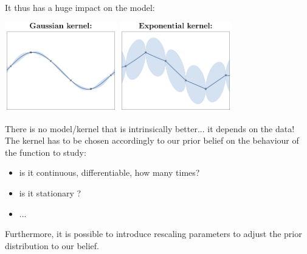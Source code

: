\documentclass{beamer}
\begin{document}
\begin{frame}{}
It thus has \alert{a huge impact on the model}:\\ 
\begin{center}
\includegraphics[height=3.9cm]{figures/R/Fig2-GP-rbf} \qquad 
\includegraphics[height=3.9cm]{figures/R/Fig2-GP-exp}
\end{center}
\end{frame}

\begin{frame}{}
There is no model/kernel that is intrinsically better... it depends on the data! \\
\vspace{5mm}
The kernel has to be chosen accordingly to our prior belief on the behaviour of the function to study:
\begin{itemize}
  \item is it continuous, differentiable, how many times?
  \item is it stationary ?
  \item ...
\end{itemize}
\vspace{5mm}
Furthermore, it is possible to introduce rescaling parameters to adjust the prior distribution to our belief.
\end{frame}
\end{document}

